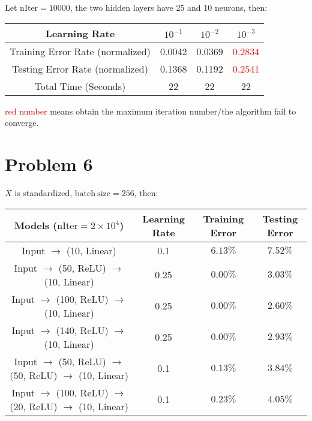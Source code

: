 \documentclass[12pt]{article}
\begin{document}
Let $\mathrm{nIter} = 10000$, the two hidden layers have 25 and 10 neurons, then:
\begin{table}[h]
\begin{tabular}{ |c|ccc| } 
\hline
Learning Rate & $10^{-1}$ & $10^{-2}$  & $10^{-3}$   \\
 \hline
 Training Error Rate (normalized) &  0.0042 &  0.0369 & \textcolor{red}{0.2834}  \\ 
 Testing Error Rate (normalized) & 0.1368  & 0.1192  & \textcolor{red}{0.2541}   \\ 
 Total Time (Seconds) & 22 & 22 & 22 \\
 \hline
\end{tabular}
\end{table}

\textcolor{red}{red number} means obtain the maximum iteration number/the algorithm fail to converge.





\section*{Problem 6}

$X$ is standardized, $\mathrm{batch \ size} = 256$, then:

\begin{table}[h]
\begin{tabular}{cccc} 
\hline
Models ($\mathrm{nIter} = 2\times10^4$) & Learning Rate &Training Error & Testing Error \\
\hline
 \hline
 Input $\rightarrow$ (10, Linear) & 0.1 & $6.13\%$ & $7.52\%$ \\
  Input $\rightarrow$ (50, ReLU)   $\rightarrow$ (10, Linear) & 0.25 & $0.00\%$ & $3.03\%$ \\
  Input $\rightarrow$ (100, ReLU)  $\rightarrow$ (10, Linear) & 0.25 & $0.00\%$ & $2.60\%$ \\
   Input $\rightarrow$ (140, ReLU)   $\rightarrow$ (10, Linear) & 0.25 & $0.00\%$ & $2.93\%$ \\
    Input $\rightarrow$ (50, ReLU) $\rightarrow$ (50, ReLU)  $\rightarrow$ (10, Linear) & 0.1 & $0.13\%$ & $3.84\%$ \\
    Input $\rightarrow$ (100, ReLU) $\rightarrow$ (20, ReLU)  $\rightarrow$ (10, Linear) & 0.1 & $0.23\%$ & $4.05\%$ \\
    \hline
\end{tabular}
\end{table}
\end{document}
